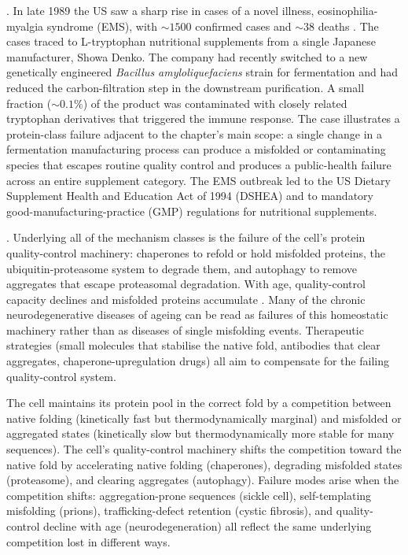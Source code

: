 . In late 1989 the US saw a sharp rise in cases of a novel
illness, eosinophilia-myalgia syndrome (EMS), with $\sim 1500$
confirmed cases and $\sim 38$ deaths
\cite{paper:v6c04-belay-tryptophan-2002}. The cases traced to L-tryptophan
nutritional supplements from a single Japanese manufacturer, Showa
Denko. The company had recently switched to a new genetically
engineered \emph{Bacillus amyloliquefaciens} strain for fermentation
and had reduced the carbon-filtration step in the downstream
purification. A small fraction ($\sim 0.1\%$) of the product was
contaminated with closely related tryptophan derivatives that
triggered the immune response. The case illustrates a protein-class
failure adjacent to the chapter's main scope: a single change in a
fermentation manufacturing process can produce a misfolded or
contaminating species that escapes routine quality control and
produces a public-health failure across an entire supplement category.
The EMS outbreak led to the US Dietary Supplement Health and
Education Act of 1994 (DSHEA) and to mandatory good-manufacturing-practice
(GMP) regulations for nutritional supplements.

. Underlying all of the mechanism
classes is the failure of the cell's protein quality-control
machinery: chaperones to refold or hold misfolded proteins, the
ubiquitin-proteasome system to degrade them, and autophagy to
remove aggregates that escape proteasomal degradation. With age,
quality-control capacity declines and misfolded proteins accumulate
\cite{paper:v6c04-saibil-chaperones-2013}. Many of the chronic
neurodegenerative diseases of ageing can be read as failures of
this homeostatic machinery rather than as diseases of single
misfolding events. Therapeutic strategies (small molecules that
stabilise the native fold, antibodies that clear aggregates,
chaperone-upregulation drugs) all aim to compensate for the failing
quality-control system.

\begin{principle}
The cell maintains its protein pool in the correct fold by a
competition between native folding (kinetically fast but
thermodynamically marginal) and misfolded or aggregated states
(kinetically slow but thermodynamically more stable for many
sequences). The cell's quality-control machinery shifts the
competition toward the native fold by accelerating native folding
(chaperones), degrading misfolded states (proteasome), and clearing
aggregates (autophagy). Failure modes arise when the competition
shifts: aggregation-prone sequences (sickle cell), self-templating
misfolding (prions), trafficking-defect retention (cystic fibrosis),
and quality-control decline with age (neurodegeneration) all reflect
the same underlying competition lost in different ways.
\end{principle}

